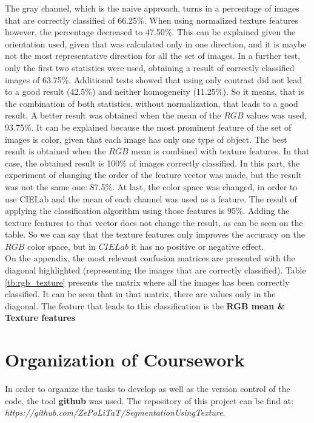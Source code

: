 \documentclass{IEEEtran}
\begin{document}

The gray channel, which is the naive approach, turns in a percentage of images that are correctly classified of 66.25\%. When using normalized texture features however, the percentage decreased to 47.50\%. This can be explained given the orientation used, given that was calculated only in one direction, and it is maybe not the most representative direction for all the set of images. In a further test, only the first two statistics were used, obtaining a result of correctly classified images of 63.75\%. Additional tests showed that using only contrast did not lead to a good result (42.5\%) and neither homogeneity (11.25\%). So it means, that is the combination of both statistics, without normalization, that leads to a good result. A better result was obtained when the mean of the $RGB$ values was used, 93.75\%. It can be explained because the most prominent feature of the set of images is color, given that each image has only one type of object. The best result is obtained when the $RGB$ mean is combined with texture features. In that case, the obtained result is 100\% of images correctly classified. In this part, the experiment of changing the order of the feature vector was made, but the result was not the same one: 87.5\%. At last, the color space was changed, in order to use CIELab and the mean of each channel was used as a feature. The result of applying the classification algorithm using those features is 95\%. Adding the texture features to that vector does not change the result, as can be seen on the table. So we can say that the texture features only improves the accuracy on the $RGB$ color space, but in $CIELab$ it has no positive or negative effect.\\


On the appendix, the most relevant confusion matrices are presented with the diagonal highlighted (representing the images that are correctly classified). Table \ref{tb:rgb_texture} presents the matrix where all the images has been correctly classified. It can be seen that in that matrix, there are values only in the diagonal. The feature that leads to this classification is the \textbf{RGB mean \& Texture features}

\section{Organization of Coursework}

In order to organize the tasks to develop as well as the version control of the code,
the tool {\bf github} was used. The repository of this project can be find at:
\textit{https://github.com/ZePoLiTaT/SegmentationUsingTexture}.\\
\end{document}
